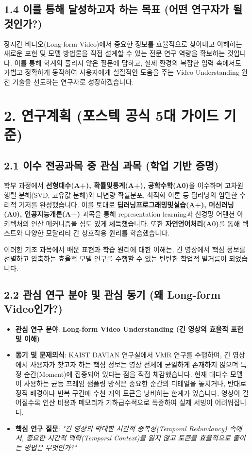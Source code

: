 \documentclass[10pt, a4paper, twocolumn]{article}
\begin{document}
\subsection{1.4 이를 통해 달성하고자 하는 목표 (어떤 연구자가 될 것인가?)}
장시간 비디오(Long-form Video)에서 중요한 정보를 효율적으로 찾아내고 이해하는 새로운 표현 및 모델 방법론을 직접 설계할 수 있는 전문 연구 역량을 확보하는 것입니다. 이를 통해 학계의 풀리지 않은 질문에 답하고, 실제 환경의 복잡한 입력 속에서도 가볍고 정확하게 동작하여 사용자에게 실질적인 도움을 주는 Video Understanding 원천 기술을 선도하는 연구자로 성장하겠습니다.

\newpage

\section{2. 연구계획 (포스텍 공식 5대 가이드 기준)}

\subsection{2.1 이수 전공과목 중 관심 과목 (학업 기반 증명)}
학부 과정에서 \textbf{선형대수(A+), 확률및통계(A+), 공학수학(A0)}을 이수하며 고차원 행렬 분해(SVD, 고유값 분해)와 다변량 확률분포, 최적화 이론 등 딥러닝의 엄밀한 수리적 기저를 완성했습니다. 이를 토대로 \textbf{딥러닝프로그래밍및실습(A+), 머신러닝(A0), 인공지능개론(A+)} 과목을 통해 representation learning과 신경망 어텐션 아키텍처의 연산 메커니즘을 심도 있게 체득했습니다. 또한 \textbf{자연언어처리(A0)}를 통해 텍스트와 다양한 모달리티 간 상호작용 원리를 학습했습니다.

이러한 기초 과목에서 배운 표현과 학습 원리에 대한 이해는, 긴 영상에서 핵심 정보를 선별하고 압축하는 효율적 모델 연구를 수행할 수 있는 탄탄한 학업적 밑거름이 되었습니다.

\subsection{2.2 관심 연구 분야 및 관심 동기 (왜 Long-form Video인가?)}
\begin{itemize}
    \item \textbf{관심 연구 분야}: \textbf{Long-form Video Understanding (긴 영상의 효율적 표현 및 이해)}
    \item \textbf{동기 및 문제의식}: KAIST DAVIAN 연구실에서 VMR 연구를 수행하며, 긴 영상에서 사용자가 찾고자 하는 핵심 정보는 영상 전체에 균일하게 존재하지 않으며 특정 순간(Moment)에 집중되어 있다는 점을 직접 체감했습니다. 현재 대다수 모델이 사용하는 균등 프레임 샘플링 방식은 중요한 순간의 디테일을 놓치거나, 반대로 정적 배경이나 반복 구간에 수천 개의 토큰을 낭비하는 한계가 있습니다. 영상이 길어질수록 연산 비용과 메모리가 기하급수적으로 폭증하여 실제 서빙이 어려워집니다.
    \item \textbf{핵심 연구 질문}: \textit{"긴 영상의 막대한 시간적 중복성(Temporal Redundancy) 속에서, 중요한 시간적 맥락(Temporal Context)을 잃지 않고 토큰을 효율적으로 줄이는 방법은 무엇인가?"}
\end{itemize}
\end{document}
